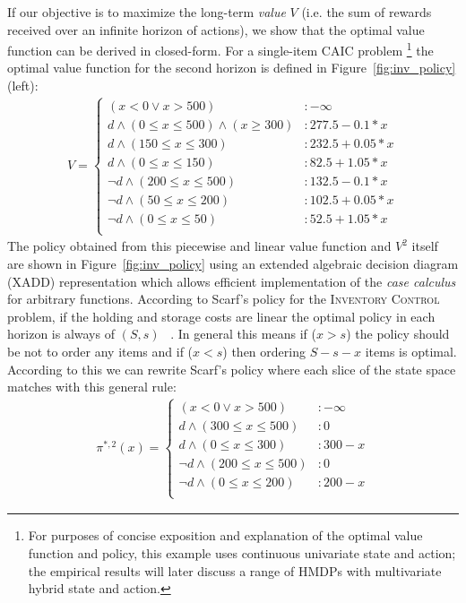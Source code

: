 \documentclass[twoside,11pt]{article}
\newcommand{\InventoryControl}{\textsc{Inventory Control }}
\begin{document}
If our objective is to maximize the long-term \emph{value} $V$ (i.e. the sum of rewards received over an infinite horizon of actions), we show that the optimal value function can be derived in closed-form. 
For a single-item CAIC problem \footnote{For purposes of concise exposition and explanation
of the optimal value function and policy, this example uses
continuous univariate state and action;
the empirical results will later discuss a range of HMDPs with
multivariate hybrid state and action.}
the optimal value function for the second horizon is defined in Figure~\ref{fig:inv_policy} (left):
\vspace{-3mm}
\begin{align}
V = \begin{cases}
(x < 0 \vee x>500) &: -\infty \\
d \land (0 \leq x \leq 500) \land (x \geq 300) &:  277.5 - 0.1 * x \\
d \land (150 \leq x \leq 300) &:  232.5 + 0.05 * x \\
d \land ( 0 \leq x \leq 150) &:  82.5 + 1.05 * x \\
\neg d \land (200 \leq x \leq 500)  &:  132.5 - 0.1 * x \\
\neg d \land (50 \leq x \leq 200) &: 102.5 + 0.05 * x \\
\neg d \land (0 \leq x \leq 50) &:  52.5 + 1.05 * x \\
\end{cases} \label{eq:vfun_inv}
\end{align}
The policy obtained from this piecewise and linear value function and $V^2$ itself are shown in Figure~\ref{fig:inv_policy} using an extended algebraic decision diagram (XADD) representation which allows efficient implementation of the \emph{case calculus} for arbitrary functions. According to Scarf's policy for the \InventoryControl problem, if the holding and storage costs are linear the optimal policy in each horizon is always of $(S,s)$ ~\cite{Scarf_Karlin58}. In general this means if ($x>s$) the policy should be not to order any items and if ($x<s$) then ordering $S-s-x$ items is optimal. 
According to this we can rewrite Scarf's policy where each slice of the state space matches with this general rule: 
\begin{align}
\pi^{*,2}(x) = 
\begin{cases}
(x < 0 \vee x>500) &: -\infty \\
d \land (300 \leq x \leq 500)  &:  0 \\
d \land (0 \leq x \leq 300) &:  300 - x \\
\neg d \land (200 \leq x \leq 500) &:  0 \\
\neg d \land (0 \leq x \leq 200) &:  200 - x \\
\end{cases}\nonumber
\end{align}
\end{document}
